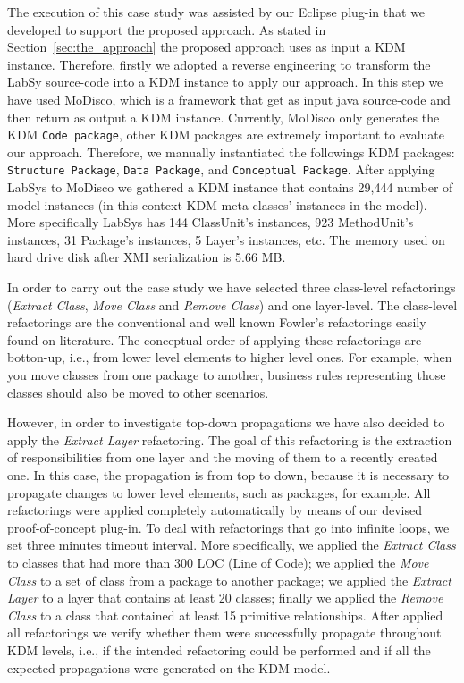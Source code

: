 The execution of this case study was assisted by our Eclipse plug-in that we developed to support the proposed approach. As stated in Section~\ref{sec:the_approach} the proposed approach uses as input a KDM instance. Therefore, firstly we adopted a reverse engineering to  transform the LabSy source-code into a KDM instance to apply our approach. In this step we have used MoDisco\cite{Brunele20141012}, which is a framework that get as input java source-code and then return as output a KDM instance. Currently, MoDisco only generates the KDM \texttt{Code package}, other KDM packages are extremely important to evaluate our approach. Therefore, we manually instantiated the followings KDM packages: \texttt{Structure Package}, \texttt{Data Package}, and \texttt{Conceptual Package}. After applying LabSys to MoDisco we gathered a KDM instance that contains 29,444 number of model instances (in this context KDM meta-classes' instances in the model). More specifically LabSys has 144 ClassUnit's instances, 923 MethodUnit's instances, 31 Package's instances, 5 Layer's instances, etc. The memory used on hard drive disk after XMI serialization is 5.66 MB.


In order to carry out the case study we have selected three class-level refactorings (\textit{Extract Class}, \textit{Move Class} and \textit{Remove Class}) and one layer-level. The class-level refactorings are the conventional and well known Fowler's refactorings easily found on literature. The conceptual order of applying these refactorings are botton-up, i.e., from lower level elements to higher level ones. For example, when you move classes from one package to another, business rules representing those classes should also be moved to other scenarios.
        
However, in order to investigate top-down propagations we have also decided to apply the \textit{Extract Layer} refactoring. The goal of this refactoring is the extraction of responsibilities from one layer and the moving of them to a recently created one. In this case, the propagation is from top to down, because it is necessary to propagate changes to lower level elements, such as packages, for example. All refactorings were applied completely automatically by means of our devised proof-of-concept plug-in. To deal with refactorings that go into infinite loops, we set three minutes timeout interval. More specifically, we applied the \textit{Extract Class} to classes that had more than 300 LOC (Line of Code); we applied the \textit{Move Class} to a set of class from a package to another package; we applied the \textit{Extract Layer} to a layer that contains at least 20 classes; finally we applied the \textit{Remove Class} to a class that contained at least 15 primitive relationships. After applied all refactorings we verify whether them were successfully propagate throughout KDM levels, i.e., if the intended refactoring could be performed and if all the expected propagations were generated on the KDM model. 

